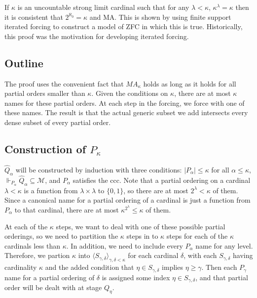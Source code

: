 \documentclass[12pt]{article}
\begin{document}
If $\kappa$ is an uncountable strong limit cardinal such that for any $\lambda<\kappa$, $\kappa^\lambda=\kappa$ then it is consistent that $2^{\aleph_0}=\kappa$ and MA.  This is shown by using finite support iterated forcing to construct a model of ZFC in which this is true.  Historically, this proof was the motivation for developing iterated forcing.

\subsection*{Outline}

The proof uses the convenient fact that $MA_\kappa$ holds as long as it holds for all partial orders smaller than $\kappa$.  Given the conditions on $\kappa$, there are at most $\kappa$ names for these partial orders.  At each step in the forcing, we force with one of these names.  The result is that the actual generic subset we add intersects every dense subset of every partial order.

\subsection*{Construction of $P_\kappa$}
$\hat{Q}_\alpha$ will be constructed by induction with three conditions: $|P_\alpha|\leq\kappa$ for all $\alpha\leq\kappa$, $\Vdash_{P_\alpha}\hat{Q}_\alpha\subseteq\mathcal{M}$, and $P_\alpha$ satisfies the ccc.  Note that a partial ordering on a cardinal $\lambda<\kappa$ is a function from $\lambda\times\lambda$ to $\{0,1\}$, so there are at most $2^\lambda<\kappa$ of them.  Since a canonical name for a partial ordering of a cardinal is just a function from $P_\alpha$ to that cardinal, there are at most $\kappa^{2^\lambda}\leq\kappa$ of them.

At each of the $\kappa$ steps, we want to deal with one of these possible partial orderings, so we need to partition the $\kappa$ steps in to $\kappa$ steps for each of the $\kappa$ cardinals less than $\kappa$.  In addition, we need to include every $P_\alpha$ name for any level.  Therefore, we partion $\kappa$ into $\langle S_{\gamma,\delta}\rangle_{\gamma,\delta<\kappa}$ for each cardinal $\delta$, with each $S_{\gamma,\delta}$ having cardinality $\kappa$ and the added condition that $\eta\in S_{\gamma,\delta}$ implies $\eta\geq\gamma$.  Then each $P_\gamma$ name for a partial ordering of $\delta$ is assigned some index $\eta\in S_{\gamma,\delta}$, and that partial order will be dealt with at stage $Q_\eta$.
\end{document}
